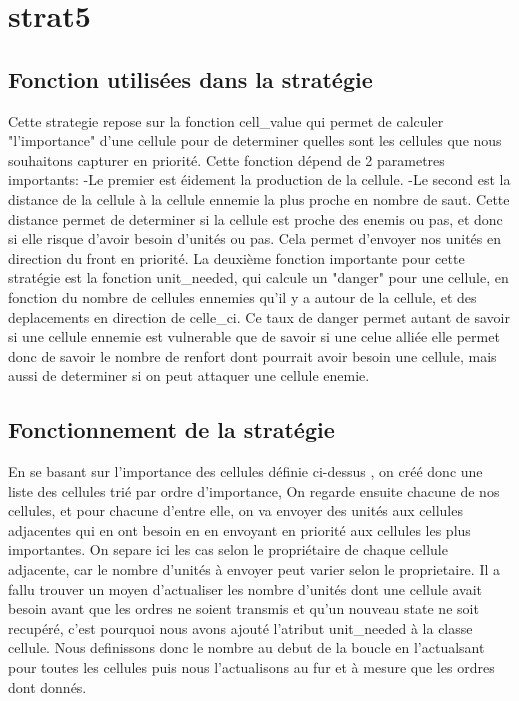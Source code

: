\documentclass{rapport}
\begin{document}
		\section{strat5}
			\subsection{Fonction utilisées dans la stratégie}
Cette strategie repose sur la fonction cell\_value qui permet de calculer "l'importance" d'une cellule
pour de determiner quelles sont les cellules que nous souhaitons capturer en priorité.
Cette fonction dépend de 2 parametres importants:
		-Le premier est éidement la production de la cellule.
		-Le second est la distance de la cellule à la cellule ennemie la plus proche en nombre de saut. Cette distance
permet de determiner si la cellule est proche des enemis ou pas, et donc si elle risque d'avoir besoin d'unités ou pas.
Cela permet d'envoyer nos unités en direction du front en priorité.
La deuxième fonction importante pour cette stratégie est la fonction unit\_needed, qui calcule un "danger" pour une cellule,
en fonction du nombre de cellules ennemies qu'il y a autour de la cellule, et des deplacements en direction de celle\_ci.
Ce taux de danger permet autant de savoir si une cellule ennemie est vulnerable que de savoir si une celue alliée elle permet donc
de savoir le nombre de renfort dont pourrait avoir besoin une cellule, mais aussi de determiner si on peut attaquer une cellule enemie.
			\subsection{Fonctionnement de la stratégie}
En se basant sur l'importance des cellules définie ci-dessus , on créé donc une liste des cellules trié par ordre d'importance,
On regarde ensuite chacune de nos cellules, et pour chacune d'entre elle, on va envoyer des unités aux cellules adjacentes qui en ont besoin
en en envoyant en priorité aux cellules les plus importantes.
On separe ici les cas selon le propriétaire de chaque cellule adjacente, car le nombre d'unités à envoyer peut varier selon le proprietaire.
Il a fallu trouver un moyen d'actualiser les nombre d'unités dont une cellule avait besoin avant que les ordres ne soient transmis et qu'un nouveau
state ne soit recupéré, c'est pourquoi nous avons ajouté l'atribut unit\_needed à la classe cellule. Nous definissons donc le nombre au debut de la boucle
en l'actualsant pour toutes les cellules puis nous l'actualisons au fur et à mesure que les ordres dont donnés.
\end{document}
